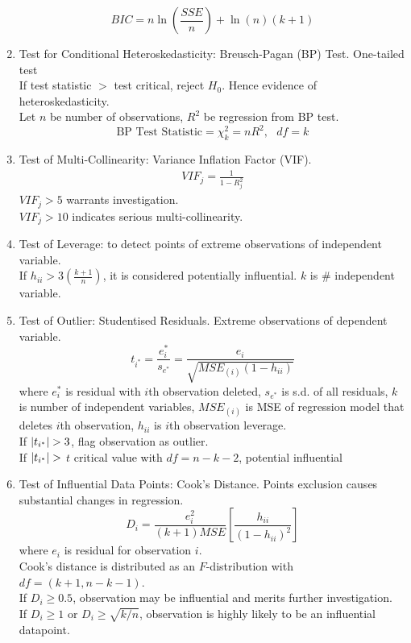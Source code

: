 \begin{enumerate}[label=\roman*.]
\begin{equation}
BIC = n \ln \left( \frac{SSE}{n} \right) + \ln (n) (k+1) \nonumber
\end{equation}
\item Test for Conditional Heteroskedasticity: Breusch-Pagan (BP) Test. One-tailed test\\
If test statistic $>$ test critical, reject $H_0$. Hence evidence of heteroskedasticity.\\
Let $n$ be number of observations, $R^2$ be regression from BP test.
\begin{equation}
\text{BP Test Statistic} = \chi^2_{k} = nR^2, \ \ \ df = k \nonumber
\end{equation}
\item Test of Multi-Collinearity: Variance Inflation Factor (VIF).
\begin{align}
VIF_j = \frac{1}{1 - R^2_j} \nonumber
\end{align}
$VIF_j > 5$ warrants investigation.\\
$VIF_j > 10$ indicates serious multi-collinearity.
\item Test of Leverage: to detect points of extreme observations of independent variable.\\
If $h_{ii} > 3 (\frac{k+1}{n})$, it is considered potentially influential. $k$ is $\#$ independent variable.
\item Test of Outlier: Studentised Residuals. Extreme observations of dependent variable.
\begin{equation}
t_{i^*} = \frac{e^{*}_i}{s_{e^*}} = \frac{e_i}{\sqrt{MSE_{(i)} (1-h_{ii})}} \nonumber
\end{equation}
where $e^{*}_i$ is residual with $i$th observation deleted, $s_{e^*}$ is s.d. of all residuals, $k$ is number of independent variables, $MSE_{(i)}$ is MSE of regression model that deletes $i$th observation, $h_{ii}$ is $i$th observation leverage.\\
If $\left\lvert t_{i^*}\right\rvert > 3$, flag observation as outlier.\\
If $\left\lvert t_{i^*}\right\rvert >$ $t$ critical value with $df=n-k-2$, potential influential
\item Test of Influential Data Points: Cook's Distance. Points exclusion causes substantial changes in regression.\\
\begin{equation}
D_i = \frac{e_i^2}{(k+1)MSE} \left[ \frac{h_{ii}}{(1-h_{ii})^2} \right] \nonumber
\end{equation}
where $e_i$ is residual for observation $i$.\\
Cook's distance is distributed as an $F$-distribution with $df = (k+1, n-k-1)$.\\
If $D_i \geq 0.5$, observation may be influential and merits further investigation.\\
If $D_i \geq 1$ or $D_i \geq \sqrt{k/n}$, observation is highly likely to be an influential datapoint.
\end{enumerate}


